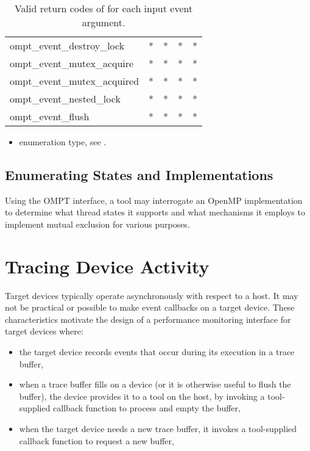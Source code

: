 \begin{table}
\begin{tabular}{lp{3em}p{3em}p{3em}p{3em}}
ompt\_event\_destroy\_lock          & * & * & * & * \\
ompt\_event\_mutex\_acquire         & * & * & * & * \\
ompt\_event\_mutex\_acquired        & * & * & * & * \\
ompt\_event\_nested\_lock           & * & * & * & * \\
ompt\_event\_flush                  & * & * & * & * \\
\bottomrule
\end{tabular}
\caption{Valid return codes of  for each input event argument.}
\label{table:valid_rc}
\end{table}

\crossreferences
\begin{itemize}
\item {} enumeration type, see
.
\end{itemize}

\clearpage

\subsection{Enumerating States and Implementations}
Using the OMPT interface, a tool may interrogate an OpenMP implementation to 
determine what thread states it supports and what mechanisms it employs to 
implement mutual exclusion for various purposes.

\section{Tracing Device Activity}
\label{sec:tracing-device-activity}

Target devices typically operate asynchronously with respect to a
host. It may not be practical or possible to make event callbacks
on a target device. These characteristics motivate the design of a
performance monitoring interface for target devices where:

\begin{itemize}
\item the target device records events that occur during its execution in a trace buffer,
\item when a trace buffer fills on a device (or it is otherwise useful to flush the buffer),  the device provides it to a tool on the host, by invoking a tool-supplied callback function to process and empty the buffer,
\item when the target device needs a new trace buffer, it invokes a tool-supplied callback function to request a new buffer,
\end{itemize}


